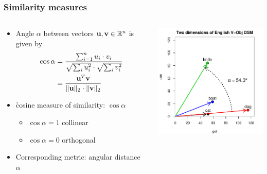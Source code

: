 \documentclass[t]{beamer} %
\begin{document}
\begin{frame}
  \frametitle{Similarity measures}
  
  \begin{columns}[c]
    \begin{column}{5cm}
      \begin{itemize}
        \item Angle $\alpha$ between vectors $\vu,\vv\in \setR^n$ is given by
          \begin{align*}
            \cos \alpha &= 
            \frac{\sum_{i=1}^n u_i\cdot v_i}{
              \sqrt{\sum_i u_i^2}\cdot \sqrt{\sum_i v_i^2}}
            \\
            &= \frac{\vu^T \vv}{\norm[2]{\vu}\cdot \norm[2]{\vv}}
        \end{align*}
      \item<2-> \h{cosine} measure of similarity: $\cos \alpha$
        \begin{itemize}
        \item $\cos \alpha = 1$ \so collinear
        \item $\cos \alpha = 0$ \so orthogonal
        \end{itemize}
      \item<2-> Corresponding metric: angular distance $\alpha$
      \end{itemize}
    \end{column}
    \begin{column}{6cm}
      \includegraphics[width=6cm]{img/hieroglyph_2d_4}
    \end{column}
  \end{columns}
\end{frame}

\end{document}
